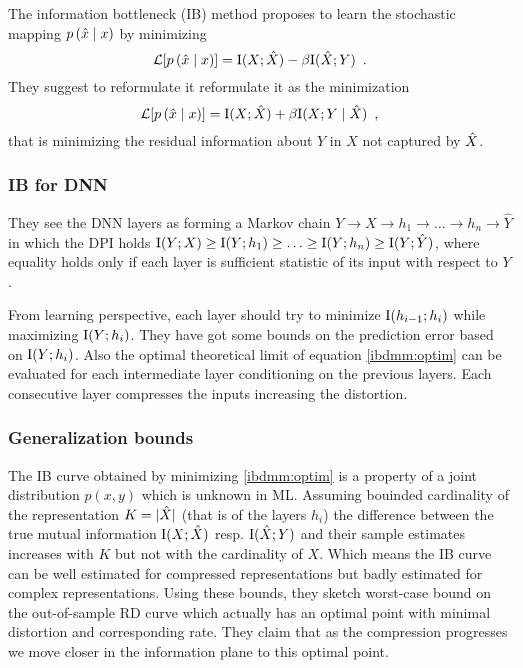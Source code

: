 The information bottleneck (IB) method proposes to learn the stochastic mapping $p \left( \hat{x} \mid x \right)$ by minimizing
\begin{equation}
\mathcal{L}[ p \left( \hat{x} \mid x \right)] = \mathrm{I}(X; \hat{X}) - \beta \mathrm{I}(\hat{X}; Y) \enspace .
\end{equation}
They suggest to reformulate it reformulate it as the minimization
\begin{equation}\label{ibdmm:optim}
\mathcal{L}[ p \left( \hat{x} \mid x \right)] = \mathrm{I}(X; \hat{X}) + \beta \mathrm{I}(X; Y \mid \hat{X}) \enspace ,
\end{equation}
that is minimizing the residual information about $Y$ in $X$ not captured by $\hat{X}$.

\subsubsection{IB for DNN}

They see the DNN layers as forming a Markov chain $Y \to X \to h_1 \to \ldots \to h_n \to \hat{Y}$ in which the DPI holds $\mathrm{I}(Y; X) \geq \mathrm{I}(Y; h_1) \geq \ldots \geq \mathrm{I}(Y; h_n) \geq \mathrm{I}(Y; \hat{Y})$, where equality holds only if each layer is sufficient statistic of its input with respect to $Y$.

From learning perspective, each layer should try to minimize $\mathrm{I}(h_{i-1}; h_i)$ while maximizing $\mathrm{I}(Y; h_i)$.
They have got some bounds on the prediction error based on $\mathrm{I}(Y; h_i)$.
Also the optimal theoretical limit of equation \eqref{ibdmm:optim} can be evaluated for each intermediate layer conditioning on the previous layers.
Each consecutive layer compresses the inputs increasing the distortion.

\subsubsection{Generalization bounds}

The IB curve obtained by minimizing \eqref{ibdmm:optim} is a property of a joint distribution $p(x, y)$ which is unknown in ML.
Assuming bouinded cardinality of the representation $K = \lvert \hat{X} \rvert$ (that is of the layers $h_i$) the difference between the true mutual information $\mathrm{I}(X; \hat{X})$ resp. $\mathrm{I}(\hat{X}; Y)$ and their sample estimates increases with $K$ but not with the cardinality of $X$.
Which means the IB curve can be well estimated for compressed representations but badly estimated for complex representations.
Using these bounds, they sketch worst-case bound on the out-of-sample RD curve which actually has an optimal point with minimal distortion and corresponding rate. 
They claim that as the compression progresses we move closer in the information plane to this optimal point.
 
